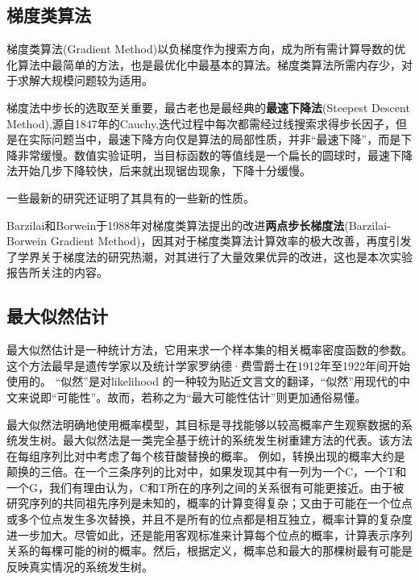 \subsection{梯度类算法}

梯度类算法(Gradient Method)以负梯度作为搜索方向，成为所有需计算导数的优化算法中最简单的方法，也是最优化中最基本的算法。梯度类算法所需内存少，对于求解大规模问题较为适用。

梯度法中步长的选取至关重要，最古老也是最经典的\textbf{最速下降法}(Steepest Descent Method),源自1847年的Cauchy\cite{cauchy1847methode},迭代过程中每次都需经过线搜索求得步长因子，但是在实际问题当中，最速下降方向仅是算法的局部性质，并非“最速下降”，而是下降非常缓慢。数值实验证明，当目标函数的等值线是一个扁长的圆球时，最速下降法开始几步下降较快，后来就出现锯齿现象，下降十分缓慢\cite{akaike1959successive,forsythe1968asymptotic}。

一些最新的研究\cite{de2013spectral,nocedal2002behavior}还证明了其具有的一些新的性质。

Barzilai和Borwein\cite{barzilai1988two}于1988年对梯度类算法提出的改进\textbf{两点步长梯度法}(Barzilai-Borwein Gradient Method)，因其对于梯度类算法计算效率的极大改善，再度引发了学界关于梯度法的研究热潮，对其进行了大量效果优异的改进，这也是本次实验报告所关注的内容。

\subsection{最大似然估计}
最大似然估计是一种统计方法，它用来求一个样本集的相关概率密度函数的参数。这个方法最早是遗传学家以及统计学家罗纳德·费雪爵士在1912年至1922年间开始使用的。
“似然”是对likelihood 的一种较为贴近文言文的翻译，“似然”用现代的中文来说即“可能性”。故而，若称之为“最大可能性估计”则更加通俗易懂。

最大似然法明确地使用概率模型，其目标是寻找能够以较高概率产生观察数据的系统发生树。最大似然法是一类完全基于统计的系统发生树重建方法的代表。该方法在每组序列比对中考虑了每个核苷酸替换的概率。
例如，转换出现的概率大约是颠换的三倍。在一个三条序列的比对中，如果发现其中有一列为一个C，一个T和一个G，我们有理由认为，C和T所在的序列之间的关系很有可能更接近。由于被研究序列的共同祖先序列是未知的，概率的计算变得复杂；又由于可能在一个位点或多个位点发生多次替换，并且不是所有的位点都是相互独立，概率计算的复杂度进一步加大。尽管如此，还是能用客观标准来计算每个位点的概率，计算表示序列关系的每棵可能的树的概率。然后，根据定义，概率总和最大的那棵树最有可能是反映真实情况的系统发生树。

